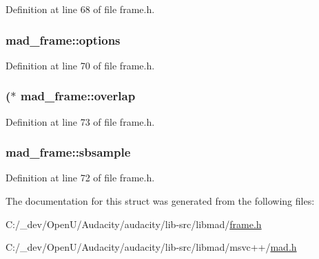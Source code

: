 Definition at line 68 of file frame.\+h.

\subsubsection[{\texorpdfstring{options}{options}}]{ mad\+\_\+frame\+::options}\hypertarget{structmad__frame_a9a7cdd4253810f2ec5ff5bace7144e53}{}\label{structmad__frame_a9a7cdd4253810f2ec5ff5bace7144e53}


Definition at line 70 of file frame.\+h.

\subsubsection[{\texorpdfstring{overlap}{overlap}}]{($\ast$ mad\+\_\+frame\+::overlap}\hypertarget{structmad__frame_afc8e2e262968a482023531799e2c8d2e}{}\label{structmad__frame_afc8e2e262968a482023531799e2c8d2e}


Definition at line 73 of file frame.\+h.

\subsubsection[{\texorpdfstring{sbsample}{sbsample}}]{ mad\+\_\+frame\+::sbsample}\hypertarget{structmad__frame_a9c70d94f445671d5d7cf09bbbc9cbfef}{}\label{structmad__frame_a9c70d94f445671d5d7cf09bbbc9cbfef}


Definition at line 72 of file frame.\+h.



The documentation for this struct was generated from the following files\+:\begin{DoxyCompactItemize}
\item 
C\+:/\+\_\+dev/\+Open\+U/\+Audacity/audacity/lib-\/src/libmad/\hyperlink{libmad_2frame_8h}{frame.\+h}\item 
C\+:/\+\_\+dev/\+Open\+U/\+Audacity/audacity/lib-\/src/libmad/msvc++/\hyperlink{lib-src_2libmad_2msvc_09_09_2mad_8h}{mad.\+h}\end{DoxyCompactItemize}
